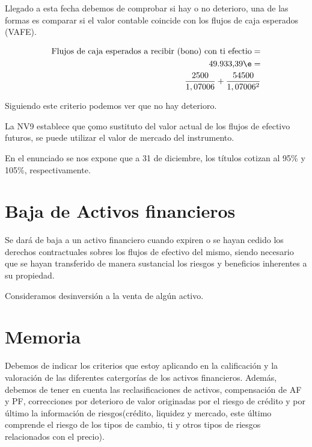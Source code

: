 Llegado a esta fecha debemos de comprobar si hay o no deterioro, una de las formas es comparar si el valor contable coincide con los flujos de caja esperados (VAFE).

\begin{align*}
    \text{Flujos de caja esperados a recibir (bono) con ti efectio} = \\
    \text{49.933,39} \e = \\
    \frac{2500}{1,07006} + \frac{54500}{1,07006^2}
\end{align*}

Siguiendo este criterio podemos ver que no hay deterioro.

La NV9 establece que \c{como sustituto del valor actual de los flujos de efectivo futuros, se puede utilizar el valor de mercado del instrumento.}

En el enunciado se nos expone que a 31 de diciembre, los títulos cotizan al 95\% y 105\%, respectivamente.















\newpage
\section{Baja de Activos financieros}

Se dará de baja a un activo financiero cuando expiren o se hayan cedido los derechos contractuales sobres los flujos de efectivo del mismo, siendo necesario que se hayan transferido de manera sustancial los riesgos y beneficios inherentes a su propiedad. 











Consideramos desinversión a la venta de algún activo. 
\newpage
\section{Memoria}

Debemos de indicar los criterios que estoy aplicando en la calificación y la valoración de las diferentes catergorías de los activos financieros. 
Además, debemos de tener en cuenta las reclasificaciones de activos, compensación de AF y PF, correcciones por deterioro de valor originadas por el riesgo de crédito y por último la información de riesgos(crédito, liquidez y mercado, este último comprende el riesgo de los tipos de cambio, ti y otros tipos de riesgos relacionados con el precio).


